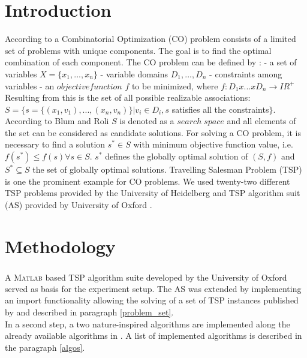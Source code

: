 \documentclass[conference]{IEEEtran}
\begin{document}
	\section{Introduction}
 	According to \cite{bernhard2008combinatorial, halim2019combinatorial, gutin2006traveling} a Combinatorial Optimization (CO) problem consists of a limited set of problems with unique components. The goal is to find the optimal combination of each component. The CO problem can be defined by \cite{blum2003metaheuristics}:\newline
 	- a set of variables $X = \{x_1,...,x_n\}$\newline
 	- variable domains $D_1,...,D_n$\newline
 	- constraints among variables\newline
 	- an $objective function$ $f$ to be minimized, where $f:D_1x ... xD_n \xrightarrow{} IR^+$\newline
 	Resulting from this is the set of all possible realizable associations: 
 	$S=\{s=\{(x_1,v_1),...,(x_n,v_n)\} | v_i \in{} D_i, s$ satisfies all the constraints$\}$. According to Blum and Roli \cite{blum2003metaheuristics} $S$ is denoted as a $search \; space$ and all elements of the set can be considered as candidate solutions. For solving a CO problem, it is necessary to find a solution $s^* \in S$ with minimum objective function value, i.e. $f(s^*) \leq f(s) \forall s \in S$. $s^*$ defines the globally optimal solution of $(S,f)$ and $S^* \subseteq S$ the set of globally optimal solutions. Travelling Salesman Problem (TSP) is one the prominent example for CO problems.
	We used twenty-two different TSP problems provided by the University of Heidelberg \cite{tsplib201heidelberg} and TSP algorithm suit (AS) provided by University of Oxford \cite{tsp2019sheridan}. 
	
	\section{Methodology}
	A \textsc{Matlab}\textsuperscript{\textregistered} based TSP algorithm suite developed by the University of Oxford \cite{tsp2019sheridan} served as basis for the experiment setup. The AS was extended by implementing an import functionality allowing the solving of a set of TSP instances published by \cite{tsplib2019} and described in paragraph \ref{problem_set}.\\
 	In a second step, a two nature-inspired algorithms are implemented along the already available algorithms in \cite{tsp2019sheridan}. A list of implemented algorithms is described in the paragraph \ref{algos}.
\end{document}
